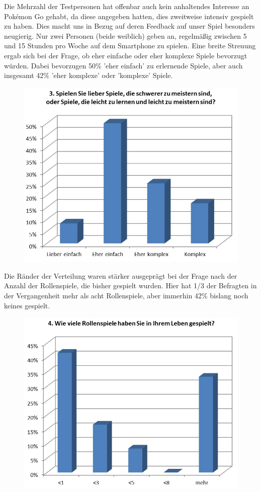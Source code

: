 \documentclass[extern,palatino]{cgBA}
\begin{document}
Die Mehrzahl der Testpersonen hat offenbar auch kein anhaltendes Interesse an Pokémon Go gehabt, da diese angegeben hatten, dies zweitweise intensiv gespielt zu haben. Dies macht uns in Bezug auf deren Feedback auf unser Spiel besonders neugierig. Nur zwei Personen (beide weiblich) geben an, regelmäßig zwischen 5 und 15 Stunden pro Woche auf dem Smartphone zu spielen. 
Eine breite Streuung ergab sich bei der Frage, ob eher einfache oder eher komplexe Spiele bevorzugt würden. Dabei bevorzugen 50\% 'eher einfach' zu erlernende Spiele, aber auch insgesamt 42\% 'eher komplexe' oder 'komplexe' Spiele. 
\begin{figure}[H]
	\centering
	\includegraphics[width=1\textwidth]{table2.jpg}
\end{figure}
Die Ränder der Verteilung  waren stärker ausgeprägt bei der Frage nach der Anzahl der Rollenspiele, die bisher gespielt wurden. Hier hat 1/3 der Befragten in der Vergangenheit mehr als acht Rollenspiele, aber immerhin 42\% bislang noch keines gespielt.
\begin{figure}[H]
	\centering
	\includegraphics[width=1\textwidth]{table3.jpg}
\end{figure}
\end{document}
